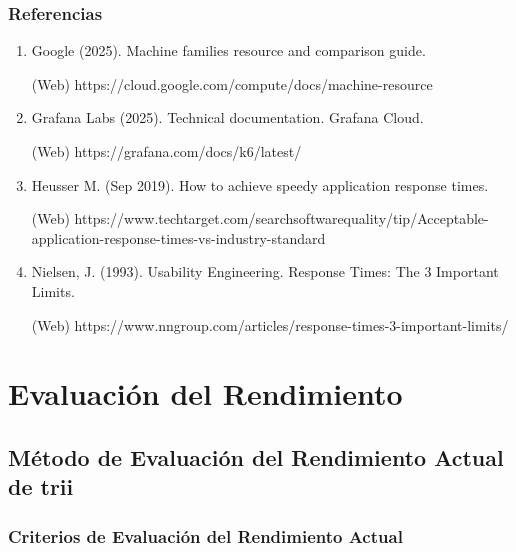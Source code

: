 \documentclass[
  paper=a4,
  ,captions=tableheading
]{scrartcl}
\renewenvironment{quote}{\begin{customblockquote}\list{}{\rightmargin=0em\leftmargin=0em}%
\item\relax\color{blockquote-text}\ignorespaces}{\unskip\unskip\endlist\end{customblockquote}}
\begin{document}
\subsubsection{Referencias}\label{sec:referencias}

\begin{enumerate}
\def\labelenumi{\arabic{enumi}.}
\item
  Google (2025). Machine families resource and comparison guide.

  (Web) https://cloud.google.com/compute/docs/machine-resource
\item
  Grafana Labs (2025). Technical documentation. Grafana Cloud.

  (Web) https://grafana.com/docs/k6/latest/
\item
  Heusser M. (Sep 2019). How to achieve speedy application response
  times.

  (Web)
  https://www.techtarget.com/searchsoftwarequality/tip/Acceptable-application-response-times-vs-industry-standard
\item
  Nielsen, J. (1993). Usability Engineering. Response Times: The 3
  Important Limits.

  (Web)
  https://www.nngroup.com/articles/response-times-3-important-limits/
\end{enumerate}

\newpage

\section{Evaluación del
Rendimiento}\label{sec:evaluaciuxf3n-del-rendimiento}

\subsection{Método de Evaluación del Rendimiento Actual de
trii}\label{sec:muxe9todo-de-evaluaciuxf3n-del-rendimiento-actual-de-trii}

\begin{quote}
\end{quote}

\subsubsection{Criterios de Evaluación del Rendimiento
Actual}\label{sec:criterios-de-evaluaciuxf3n-del-rendimiento-actual}
\end{document}
